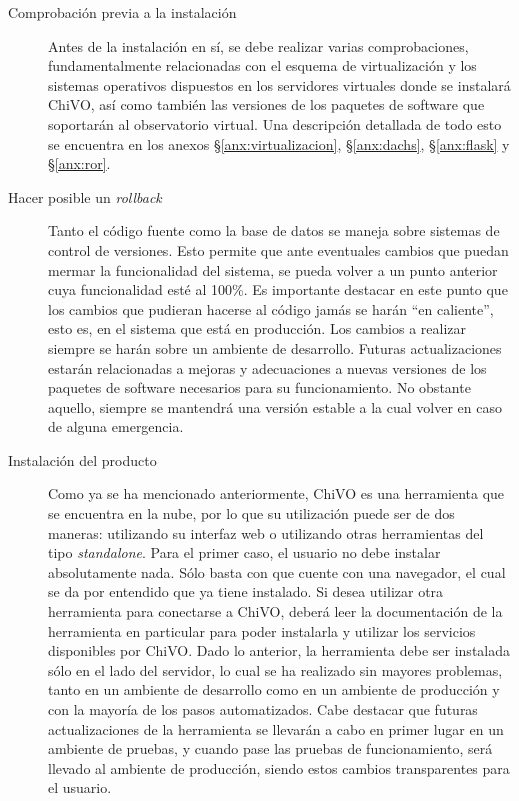 \begin{description}
		\begin{description}
			\item [Comprobación previa a la instalación] Antes de la instalación en sí, se debe realizar varias comprobaciones, fundamentalmente relacionadas con el esquema de virtualización y los sistemas operativos dispuestos en los servidores virtuales donde se instalará ChiVO, así como tambi\'en las versiones de los paquetes de software que soportarán al observatorio virtual. Una descripción detallada de todo esto se encuentra en los anexos \S\ref{anx:virtualizacion}, \S\ref{anx:dachs}, \S\ref{anx:flask} y \S\ref{anx:ror}.
			\item [Hacer posible un \emph{rollback}] Tanto el código fuente como la base de datos se maneja sobre sistemas de control de versiones. Esto permite que ante eventuales cambios que puedan mermar la funcionalidad del sistema, se pueda volver a un punto anterior cuya funcionalidad est\'e al 100\%. Es importante destacar en este punto que los cambios que pudieran hacerse al código jamás se harán ``en caliente'', esto es, en el sistema que está en producción. Los cambios a realizar siempre se harán sobre un ambiente de desarrollo. Futuras actualizaciones estarán relacionadas a mejoras y adecuaciones a nuevas versiones de los paquetes de software necesarios para su funcionamiento. No obstante aquello, siempre se mantendrá una versión estable a la cual volver en caso de alguna emergencia.
			\item [Instalación del producto] Como ya se ha mencionado anteriormente, ChiVO es una herramienta que se encuentra en la nube, por lo que su utilización puede ser de dos maneras: utilizando su interfaz web o utilizando otras herramientas del tipo \emph{standalone}. Para el primer caso, el usuario no debe instalar absolutamente nada. Sólo basta con que cuente con una navegador, el cual se da por entendido que ya tiene instalado. Si desea utilizar otra herramienta para conectarse a ChiVO, deberá leer la documentación de la herramienta en particular para poder instalarla y utilizar los servicios disponibles por ChiVO. Dado lo anterior, la herramienta debe ser instalada sólo en el lado del servidor, lo cual se ha realizado sin mayores problemas, tanto en un ambiente de desarrollo como en un ambiente de producción y con la mayoría de los pasos automatizados. Cabe destacar que futuras actualizaciones de la herramienta se llevarán a cabo en primer lugar en un ambiente de pruebas, y cuando pase las pruebas de funcionamiento, será llevado al ambiente de producción, siendo estos cambios transparentes para el usuario.

\end{description}
\end{description}
